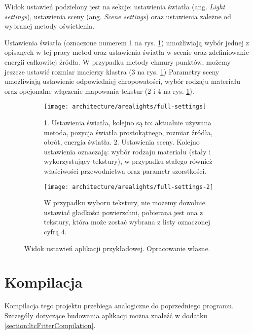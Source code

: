 \documentclass[../main.tex]{subfiles}
\begin{document}
Widok ustawień podzielony jest na sekcje: ustawienia światła (ang. \textit{Light settings}), ustawienia sceny (ang. \textit{Scene settings}) oraz ustawienia zależne od wybranej metody oświetlenia.

Ustawienia światła (oznaczone numerem 1 na rys. \ref{fig:app_arealights_settings}) umożliwiają wybór jednej z opisanych w tej pracy metod oraz ustawienia światła w scenie oraz zdefiniowanie energii całkowitej źródła. W przypadku metody chmury punktów, możemy jeszcze ustawić rozmiar macierzy klastra (3 na rys. \ref{fig:app_arealights_settings}) Parametry sceny umożliwiają ustawienie odpowiedniej chropowatości, wybór rodzaju materiału oraz opcjonalne włączenie mapowania tekstur (2 i 4 na rys. \ref{fig:app_arealights_settings}).

\begin{figure}[h]
    \centering
    \begin{subfigure}[t]{0.40\linewidth}
        \texttt{[image: architecture/arealights/full-settings]}
        \caption{1. Ustawienia światła, kolejno są to: aktualnie używana metoda, pozycja światła prostokątnego, rozmiar źródła, obrót, energia światła. 2. Ustawienia sceny. Kolejno ustawienia oznaczają: wybór rodzaju materiału (stały i wykorzystujący tekstury), w przypadku stałego również właściwości przewodnictwa oraz parametr szorstkości.}
    \end{subfigure}
    \hspace{0.05\textwidth}
    \begin{subfigure}[t]{0.40\linewidth}
        \texttt{[image: architecture/arealights/full-settings-2]}
        \caption{W przypadku wyboru tekstury, nie możemy dowolnie ustawiać gładkości powierzchni, pobierana jest ona z tekstury, która może zostać wybrana z listy oznaczonej cyfrą 4.}
    \end{subfigure}

    \caption{Widok ustawień aplikacji przykładowej. Opracowanie własne.}
    \label{fig:app_arealights_settings}
\end{figure}

\section{Kompilacja}

Kompilacja tego projektu przebiega analogiczne do poprzedniego programu. Szczegóły dotyczące budowania aplikacji można znaleźć w dodatku \ref{section:ltcFitterCompilation}.
\end{document}
